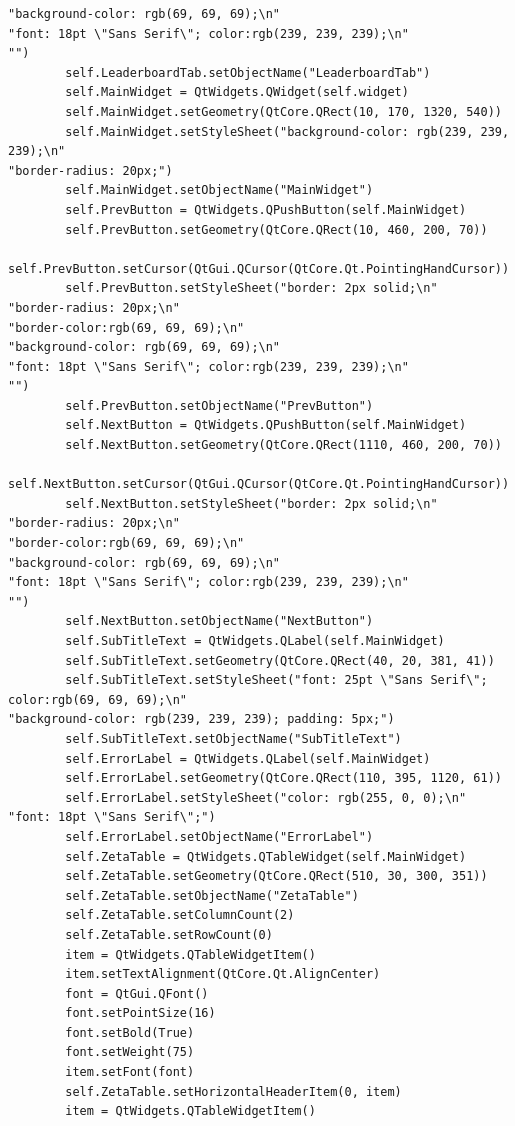 \documentclass{article}
\begin{document}
\begin{lstlisting}
"background-color: rgb(69, 69, 69);\n"
"font: 18pt \"Sans Serif\"; color:rgb(239, 239, 239);\n"
"")
        self.LeaderboardTab.setObjectName("LeaderboardTab")
        self.MainWidget = QtWidgets.QWidget(self.widget)
        self.MainWidget.setGeometry(QtCore.QRect(10, 170, 1320, 540))
        self.MainWidget.setStyleSheet("background-color: rgb(239, 239, 239);\n"
"border-radius: 20px;")
        self.MainWidget.setObjectName("MainWidget")
        self.PrevButton = QtWidgets.QPushButton(self.MainWidget)
        self.PrevButton.setGeometry(QtCore.QRect(10, 460, 200, 70))
        self.PrevButton.setCursor(QtGui.QCursor(QtCore.Qt.PointingHandCursor))
        self.PrevButton.setStyleSheet("border: 2px solid;\n"
"border-radius: 20px;\n"
"border-color:rgb(69, 69, 69);\n"
"background-color: rgb(69, 69, 69);\n"
"font: 18pt \"Sans Serif\"; color:rgb(239, 239, 239);\n"
"")
        self.PrevButton.setObjectName("PrevButton")
        self.NextButton = QtWidgets.QPushButton(self.MainWidget)
        self.NextButton.setGeometry(QtCore.QRect(1110, 460, 200, 70))
        self.NextButton.setCursor(QtGui.QCursor(QtCore.Qt.PointingHandCursor))
        self.NextButton.setStyleSheet("border: 2px solid;\n"
"border-radius: 20px;\n"
"border-color:rgb(69, 69, 69);\n"
"background-color: rgb(69, 69, 69);\n"
"font: 18pt \"Sans Serif\"; color:rgb(239, 239, 239);\n"
"")
        self.NextButton.setObjectName("NextButton")
        self.SubTitleText = QtWidgets.QLabel(self.MainWidget)
        self.SubTitleText.setGeometry(QtCore.QRect(40, 20, 381, 41))
        self.SubTitleText.setStyleSheet("font: 25pt \"Sans Serif\"; color:rgb(69, 69, 69);\n"
"background-color: rgb(239, 239, 239); padding: 5px;")
        self.SubTitleText.setObjectName("SubTitleText")
        self.ErrorLabel = QtWidgets.QLabel(self.MainWidget)
        self.ErrorLabel.setGeometry(QtCore.QRect(110, 395, 1120, 61))
        self.ErrorLabel.setStyleSheet("color: rgb(255, 0, 0);\n"
"font: 18pt \"Sans Serif\";")
        self.ErrorLabel.setObjectName("ErrorLabel")
        self.ZetaTable = QtWidgets.QTableWidget(self.MainWidget)
        self.ZetaTable.setGeometry(QtCore.QRect(510, 30, 300, 351))
        self.ZetaTable.setObjectName("ZetaTable")
        self.ZetaTable.setColumnCount(2)
        self.ZetaTable.setRowCount(0)
        item = QtWidgets.QTableWidgetItem()
        item.setTextAlignment(QtCore.Qt.AlignCenter)
        font = QtGui.QFont()
        font.setPointSize(16)
        font.setBold(True)
        font.setWeight(75)
        item.setFont(font)
        self.ZetaTable.setHorizontalHeaderItem(0, item)
        item = QtWidgets.QTableWidgetItem()

\end{lstlisting}
\end{document}
